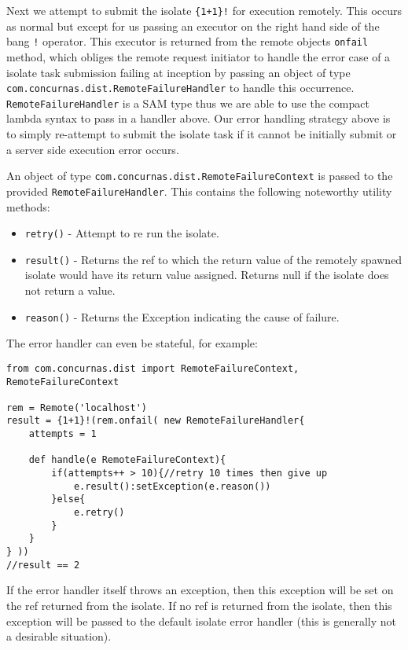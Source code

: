 \documentclass[conc-doc]{subfiles}
\begin{document}
Next we attempt to submit the isolate \lstinline!{1+1}!\lstinline{!} for execution remotely. This occurs as normal but except for us passing an executor on the right hand side of the bang \lstinline{!} operator. This executor is returned from the remote objects \lstinline{onfail} method, which obliges the remote request initiator to handle the error case of a isolate task submission failing at inception by passing an object of type \lstinline{com.concurnas.dist.RemoteFailureHandler} to handle this occurrence. \lstinline{RemoteFailureHandler} is a SAM type thus we are able to use the compact lambda syntax to pass in a handler above. Our error handling strategy above is to simply re-attempt to submit the isolate task if it cannot be initially submit or a server side execution error occurs.

An object of type \lstinline{com.concurnas.dist.RemoteFailureContext} is passed to the provided \lstinline{RemoteFailureHandler}. This contains the following noteworthy utility methods:

\begin{itemize}
	\item \lstinline{retry()} - Attempt to re run the isolate.
	\item \lstinline{result()} - Returns the ref to which the return value of the remotely spawned isolate would have its return value assigned. Returns null if the isolate does not return a value.
	\item \lstinline{reason()} - Returns the Exception indicating the cause of failure.
\end{itemize}

The error handler can even be stateful, for example:
\begin{lstlisting}
from com.concurnas.dist import RemoteFailureContext, RemoteFailureContext

rem = Remote('localhost')
result = {1+1}!(rem.onfail( new RemoteFailureHandler{  
	attempts = 1
	
	def handle(e RemoteFailureContext){
		if(attempts++ > 10){//retry 10 times then give up
			e.result():setException(e.reason())
		}else{
			e.retry()
		}
	}
} ))
//result == 2
\end{lstlisting}

If the error handler itself throws an exception, then this exception will be set on the ref returned from the isolate. If no ref is returned from the isolate, then this exception will be passed to the default isolate error handler (this is generally not a desirable situation).
\end{document}
